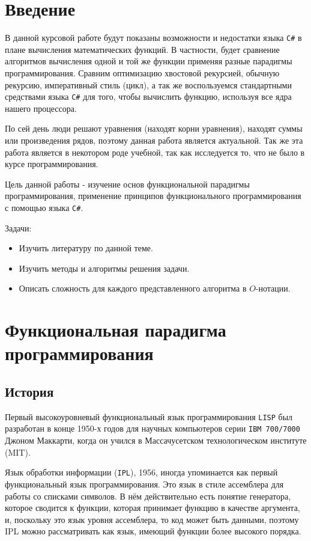 \section*{Введение}

В данной курсовой работе будут показаны возможности и недостатки языка \texttt{C\#} в плане вычисления математических функций.
В частности, будет сравнение алгоритмов вычисления одной и той же функции применяя разные парадигмы программирования.
Сравним оптимизацию хвостовой рекурсией, обычную рекурсию, императивный стиль (цикл), а так же воспользуемся стандартными средствами языка \texttt{C\#} для того, чтобы вычислить функцию, используя все ядра нашего процессора.

По сей день люди решают уравнения (находят корни уравнения), находят суммы или произведения рядов, поэтому данная работа является актуальной. Так же эта работа является в некотором роде учебной, так как исследуется то, что не было в курсе программирования.

Цель данной работы - изучение основ функциональной парадигмы программирования, применение принципов функционального программирования с помощью языка \texttt{C\#}.

Задачи:

\begin{itemize}
	\item Изучить литературу по данной теме.
	\item Изучить методы и алгоритмы решения задачи.
	\item Описать сложность для каждого представленного алгоритма в $O$-нотации.
\end{itemize}

\newpage
\section{Функциональная парадигма программирования}

\subsection{История}

Первый высокоуровневый функциональный язык программирования \texttt{LISP} был разработан в конце 1950-х годов для научных компьютеров серии \texttt{IBM 700/7000} Джоном Маккарти, когда он учился в Массачусетском технологическом институте (MIT). \cite{HistoryofLISP}

Язык обработки информации (\texttt{IPL}), 1956, иногда упоминается как первый функциональный язык программирования.
Это язык в стиле ассемблера для работы со списками символов. \cite{ModelsofMyLife}
В нём действительно есть понятие генератора, которое сводится к функции, которая принимает функцию в качестве аргумента, и, поскольку это язык уровня ассемблера, то код может быть данными, поэтому IPL можно рассматривать как язык, имеющий функции более высокого порядка.

